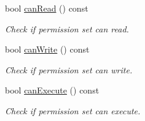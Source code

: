 \begin{DoxyCompactItemize}
bool \hyperlink{classlibrary_1_1core_1_1fs_1_1_permission_set_af31f6c5e1bd75102749648fd41882beb}{can\+Read} () const
\begin{DoxyCompactList}\small\item\em Check if permission set can read. \end{DoxyCompactList}\item 
bool \hyperlink{classlibrary_1_1core_1_1fs_1_1_permission_set_a12851523996c6c4414749ee9c2f3bbd2}{can\+Write} () const
\begin{DoxyCompactList}\small\item\em Check if permission set can write. \end{DoxyCompactList}\item 
bool \hyperlink{classlibrary_1_1core_1_1fs_1_1_permission_set_a40da22aa91ee4c8963c1c5434dd8486c}{can\+Execute} () const
\begin{DoxyCompactList}\small\item\em Check if permission set can execute. \end{DoxyCompactList}\end{DoxyCompactItemize}

